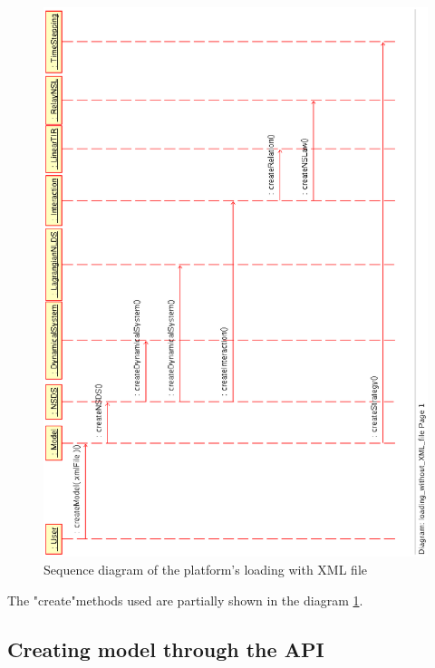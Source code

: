 \begin{figure}
\begin{center}
        \includegraphics[scale=0.75, clip]{figure/platform_loading_XML.ps}
        \caption{Sequence diagram of the platform's loading with XML file}
        \label{fig: platform's loading1}
\end{center}
\end{figure}

The "create"methods used are partially shown in the diagram \ref{fig: platform's loading1}.







\subsection{Creating model through the API}


